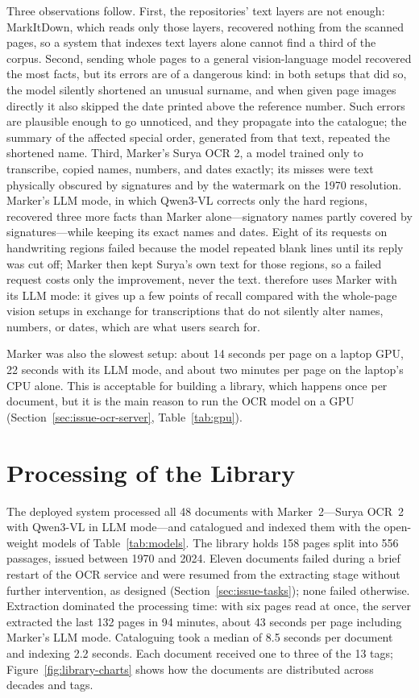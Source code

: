 Three observations follow. First, the repositories' text layers are not enough: MarkItDown, which reads only those layers, recovered nothing from the scanned pages, so a system that indexes text layers alone cannot find a third of the corpus. Second, sending whole pages to a general vision-language model recovered the most facts, but its errors are of a dangerous kind: in both setups that did so, the model silently shortened an unusual surname, and when given page images directly it also skipped the date printed above the reference number. Such errors are plausible enough to go unnoticed, and they propagate into the catalogue; the summary of the affected special order, generated from that text, repeated the shortened name. Third, Marker's Surya OCR 2, a model trained only to transcribe, copied names, numbers, and dates exactly; its misses were text physically obscured by signatures and by the watermark on the 1970 resolution. Marker's LLM mode, in which Qwen3-VL corrects only the hard regions, recovered three more facts than Marker alone---signatory names partly covered by signatures---while keeping its exact names and dates. Eight of its requests on handwriting regions failed because the model repeated blank lines until its reply was cut off; Marker then kept Surya's own text for those regions, so a failed request costs only the improvement, never the text. \cs{} therefore uses Marker with its LLM mode: it gives up a few points of recall compared with the whole-page vision setups in exchange for transcriptions that do not silently alter names, numbers, or dates, which are what users search for.

Marker was also the slowest setup: about 14 seconds per page on a laptop GPU, 22 seconds with its LLM mode, and about two minutes per page on the laptop's CPU alone. This is acceptable for building a library, which happens once per document, but it is the main reason to run the OCR model on a GPU (Section~\ref{sec:issue-ocr-server}, Table~\ref{tab:gpu}).

\section{Processing of the Library}\label{sec:processing-results}

The deployed system processed all 48 documents with Marker~2---Surya OCR~2 with Qwen3-VL in LLM mode---and catalogued and indexed them with the open-weight models of Table~\ref{tab:models}. The library holds 158 pages split into 556 passages, issued between 1970 and 2024. Eleven documents failed during a brief restart of the OCR service and were resumed from the extracting stage without further intervention, as designed (Section~\ref{sec:issue-tasks}); none failed otherwise. Extraction dominated the processing time: with six pages read at once, the server extracted the last 132 pages in 94 minutes, about 43 seconds per page including Marker's LLM mode. Cataloguing took a median of 8.5 seconds per document and indexing 2.2 seconds. Each document received one to three of the 13 tags; Figure~\ref{fig:library-charts} shows how the documents are distributed across decades and tags.

